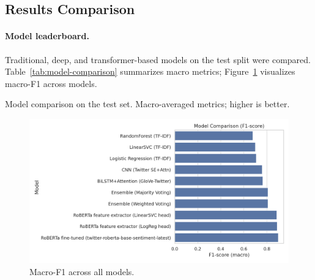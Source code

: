 \documentclass[10pt]{article}
\begin{document}
\subsection{Results Comparison}
\paragraph{Model leaderboard.}
Traditional, deep, and transformer-based models on the test split were compared. Table~\ref{tab:model-comparison} summarizes macro metrics; Figure~\ref{fig:model-f1-comparison} visualizes macro-F1 across models.

\begin{table}[H]
  \centering
  \caption{Model comparison on the test set. Macro-averaged metrics; higher is better.}
  \label{tab:model-comparison}
  
\end{table}

\begin{figure}[H]
  \centering
  \includegraphics[width=.82\linewidth]{../SCRITPS/artifacts/figures/model_f1_comparison.png}
  \caption{Macro-F1 across all models.}
  \label{fig:model-f1-comparison}
\end{figure}
\end{document}
